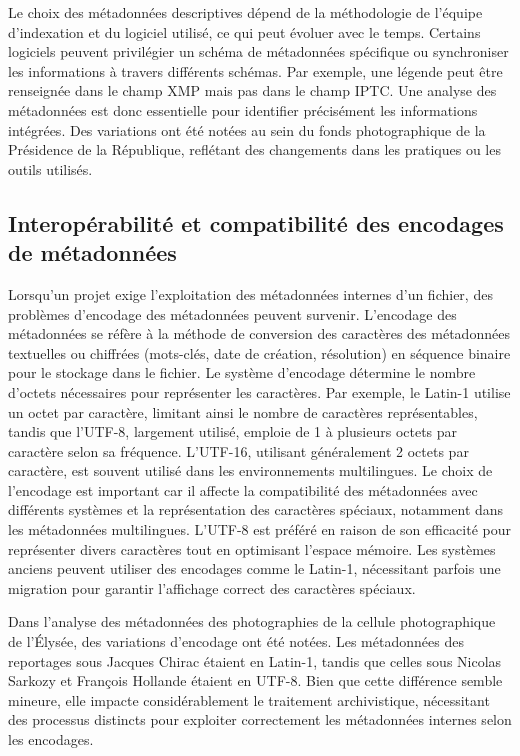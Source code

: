 Le choix des métadonnées descriptives dépend de la méthodologie de l'équipe d'indexation et du logiciel utilisé, ce qui peut évoluer avec le temps. Certains logiciels peuvent privilégier un schéma de métadonnées spécifique ou synchroniser les informations à travers différents schémas. Par exemple, une légende peut être renseignée dans le champ XMP mais pas dans le champ IPTC. Une analyse des métadonnées est donc essentielle pour identifier précisément les informations intégrées. Des variations ont été notées au sein du fonds photographique de la Présidence de la République, reflétant des changements dans les pratiques ou les outils utilisés. 

\subsection*{Interopérabilité et compatibilité des encodages de métadonnées}

Lorsqu'un projet exige l'exploitation des métadonnées internes d'un fichier, des problèmes d'encodage des métadonnées peuvent survenir. L'encodage des métadonnées se réfère à la méthode de conversion des caractères des métadonnées textuelles ou chiffrées (mots-clés, date de création, résolution) en séquence binaire pour le stockage dans le fichier. Le système d'encodage détermine le nombre d'octets nécessaires pour représenter les caractères. Par exemple, le Latin-1 utilise un octet par caractère, limitant ainsi le nombre de caractères représentables, tandis que l'UTF-8, largement utilisé, emploie de 1 à plusieurs octets par caractère selon sa fréquence. L'UTF-16, utilisant généralement 2 octets par caractère, est souvent utilisé dans les environnements multilingues. Le choix de l'encodage est important car il affecte la compatibilité des métadonnées avec différents systèmes et la représentation des caractères spéciaux, notamment dans les métadonnées multilingues. L'UTF-8 est préféré en raison de son efficacité pour représenter divers caractères tout en optimisant l'espace mémoire. Les systèmes anciens peuvent utiliser des encodages comme le Latin-1, nécessitant parfois une migration pour garantir l'affichage correct des caractères spéciaux.

Dans l'analyse des métadonnées des photographies de la cellule photographique de l'Élysée, des variations d'encodage ont été notées. Les métadonnées des reportages sous Jacques Chirac étaient en Latin-1, tandis que celles sous Nicolas Sarkozy et François Hollande étaient en UTF-8. Bien que cette différence semble mineure, elle impacte considérablement le traitement archivistique, nécessitant des processus distincts pour exploiter correctement les métadonnées internes selon les encodages.


